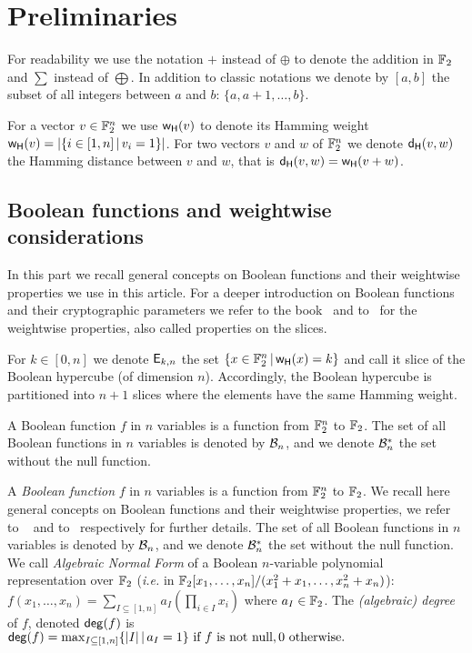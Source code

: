 \documentclass{llncs}
\begin{document}
\section{Preliminaries}

\ifnum{}
For readability we use the notation $+$ instead of 
$\oplus$ to denote the addition in $\mathbb{F}_2$ and $\sum$ instead of $\bigoplus$. 
In addition to classic notations we denote by $ [a,b] $ the subset of all integers between $a$ and $b$: $\{a, a+1, \ldots,b\}$. 

For a vector $v\in \mathbb{F}_2^n$ we use $\mathsf{w_H}(v)$ to denote its Hamming weight $\mathsf{w_H}(v)=|\{ i \in [1,n] \, | \, v_i=1 \}|$. For two vectors $v$ and $w$ of $\mathbb{F}_2^n$ we denote $\mathsf{d_H}(v,w)$ the Hamming distance between $v$ and $w$, that is $\mathsf{d_H}(v,w)=\mathsf{w_H}(v+w)$.
\fi
\ifnum{}
\subsection{Boolean functions and weightwise considerations}

In this part we recall general concepts on Boolean functions and their weightwise properties we use in this article. 
For a deeper introduction on Boolean functions and their cryptographic parameters we refer to \eg the book~\cite{Carlet20} and to~\cite{TOSC:CarMeaRot17} for the weightwise properties, also called properties on the slices.

For $k \in [0,n]$ we denote $\mathsf{E}_{k,n}$ the set $\{x\in \mathbb{F}_2^n \, | \, \mathsf{w_H}(x)=k  \}$ and call it slice of the Boolean hypercube (of dimension $n$). 
Accordingly, the Boolean hypercube is partitioned into $n+1$ slices where the elements have the same Hamming weight.


\begin{definition}\label{def:bool_f}
	A Boolean function $f$ in $n$ variables is a function from $\mathbb{F}_2^n$ to $\mathbb{F}_2$. 
	The set of all Boolean functions in $n$ variables is denoted by $\mathcal{B}_n$, and we denote $\mathcal{B}_n^*$ the set without the null function.
\end{definition}
\else 

A \emph{Boolean function} $f$ in $n$ variables is a function from $\mathbb{F}_2^n$ to $\mathbb{F}_2$. 
We recall here general concepts on Boolean functions and their weightwise properties, we refer to \eg~\cite{Carlet20} and to~\cite{TOSC:CarMeaRot17} respectively for further details.
	The set of all Boolean functions in $n$ variables is denoted by $\mathcal{B}_n$, and we denote $\mathcal{B}_n^*$ the set without the null function. We call \emph{Algebraic Normal Form} of a Boolean $n$-variable polynomial representation over $\mathbb{F}_2$ (\textit{i.e.} in $\mathbb{F}_2[x_1,\dots,x_n]/(x_1^2+x_1,\dots,x_n^2+x_n)$):
$f(x_1,\dots,x_n)= \sum_{I \subseteq [1,n]} a_I \left( \prod_{i \in I} x_i \right)$ where $a_I\in \mathbb{F}_2$. 
The \emph{(algebraic) degree} of $f$, denoted $\mathsf{deg}(f)$ is $\mathsf{deg}(f)=\max_{I\subseteq [1,n]}\{ |I|\, | \, a_I=1\}  \text{ if $f$ is not null},0  \text{ otherwise}.$
\end{document}
